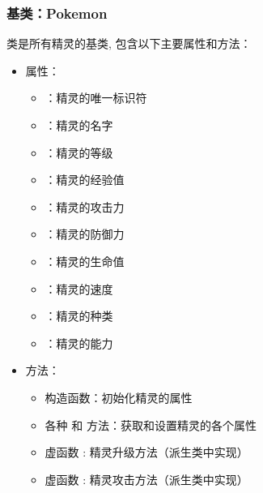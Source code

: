 \subsubsection{基类：Pokemon}

 类是所有精灵的基类, 包含以下主要属性和方法：

\begin{itemize}
    \item 属性：\begin{itemize}
              \item {}：精灵的唯一标识符
              \item {}：精灵的名字
              \item {}：精灵的等级
              \item {}：精灵的经验值
              \item {}：精灵的攻击力
              \item {}：精灵的防御力
              \item {}：精灵的生命值
              \item {}：精灵的速度
              \item {}：精灵的种类
              \item {}：精灵的能力
          \end{itemize}
    \item 方法：\begin{itemize}
              \item 构造函数：初始化精灵的属性
              \item 各种  和  方法：获取和设置精灵的各个属性
              \item 虚函数 : 精灵升级方法（派生类中实现）
              \item 虚函数 : 精灵攻击方法（派生类中实现）
          \end{itemize}
\end{itemize}

